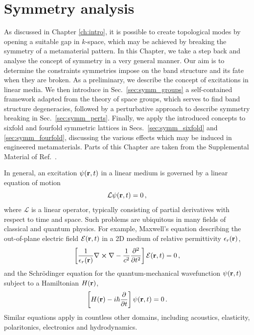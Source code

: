 
\chapter{Symmetry analysis} \label{ch:symmetry}

\begin{chapterabstract}
		
	As discussed in Chapter \ref{ch:intro}, it is possible to create topological modes by opening a suitable gap in $k$-space, which may be achieved by breaking the symmetry of a metamaterial pattern. In this Chapter, we take a step back and analyse the concept of symmetry in a very general manner. Our aim is to determine the constraints symmetries impose on the band structure and its fate when they are broken. As a preliminary, we describe the concept of excitations in linear media. We then introduce in Sec.~\ref{sec:symm_groups} a self-contained framework adapted from the theory of space groups, which serves to find band structure degeneracies, followed by a perturbative approach to describe symmetry breaking in Sec.~\ref{sec:symm_perts}. Finally, we apply the introduced concepts to sixfold and fourfold symmetric lattices in Secs.~\ref{sec:symm_sixfold} and \ref{sec:symm_fourfold}, discussing the various effects which may be induced in engineered metamaterials. 	
	\tcblower
	Parts of this Chapter are taken from the Supplemental Material of Ref.~\cite{Kosata_2021}.
\end{chapterabstract}

In general, an excitation $\psi(\vb{r} ,t)$ in a linear medium is governed by a linear equation of motion
\begin{equation} \label{eq:symm_eom_gen}
\mathcal{L} \psi(\vb{r}, t) =  0 \,,
\end{equation}
where $\mathcal{L}$ is a linear operator, typically consisting of partial derivatives with respect to time and space.
Such problems are ubiquitous in many fields of classical and quantum physics. For example, Maxwell's equation describing the out-of-plane electric field $\mathcal{E}(\vb{r}, t)$ in a 2D medium of relative permittivity $\epsilon_r(\vb{r})$,
\begin{equation} \label{eq:symm_maxwell}
\left[ \frac{1}{\epsilon_r(\vb{r})} \nabla \cross \nabla - \frac{1}{c^2}\frac{\partial^2}{\partial t^2} \right] \mathcal{E}(\vb{r}, t) = 0 \,,
\end{equation}
and the Schr\"{o}dinger equation for the quantum-mechanical wavefunction $\psi(\vb{r}, t)$ subject to a Hamiltonian $H(\vb{r})$,
\begin{equation} \label{eq:symm_se}
\left[H(\vb{r}) - i \hbar \frac{\partial}{\partial t} \right] \psi(\vb{r}, t) = 0 \,.
\end{equation}
Similar equations apply in countless other domains, including acoustics, elasticity, polaritonics, electronics and hydrodynamics.

